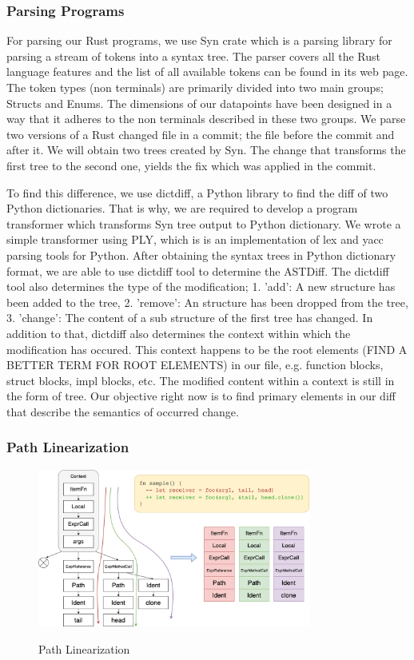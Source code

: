 \subsubsection{Parsing Programs}

For parsing our Rust programs, we use Syn crate which is a parsing library for parsing a stream of tokens into a syntax tree. The parser covers all the Rust language features and the list of all available tokens can be found in its web page. The token types (non terminals) are primarily divided into two main groups; Structs and Enums. The dimensions of our datapoints have been designed in a way that it adheres to the non terminals described in these two groups. We parse two versions of a Rust changed file in a commit; the file before the commit and after it. We will obtain two trees created by Syn. The change that transforms the first tree to the second one, yields the fix which was applied in the commit. 

To find this difference, we use dictdiff, a Python library to find the diff of two Python dictionaries. That is why, we are required to develop a program transformer which transforms Syn tree output to Python dictionary. We wrote a simple transformer using PLY, which is is an implementation of lex and yacc parsing tools for Python. After obtaining the syntax trees in Python dictionary format, we are able to use dictdiff tool to determine the ASTDiff. The dictdiff tool also determines the type of the modification; 1. 'add': A new structure has been added to the tree, 2. 'remove': An structure has been dropped from the tree, 3. 'change': The content of a sub structure of the first tree has changed. In addition to that, dictdiff also determines the context within which the modification has occured. This context happens to be the root elements (FIND A BETTER TERM FOR ROOT ELEMENTS) in our file, e.g. function blocks, struct blocks, impl blocks, etc. The modified content within a context is still in the form of tree. Our objective right now is to find primary elements in our diff that describe the semantics of occurred change.

\subsubsection{Path Linearization}

\begin{figure}[h]
\centering
\includegraphics[width=0.8\textwidth]{linearization.png}
\label{f2}
\caption{Path Linearization}
\end{figure}

